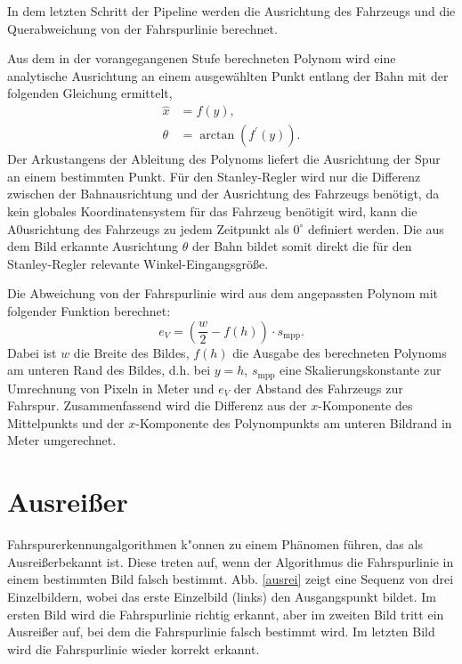 \documentclass[arbeit=studie,oneside,BCOR=12mm]{ArbeitRST}
\begin{document}
In dem letzten Schritt der Pipeline werden die Ausrichtung des Fahrzeugs und die Querabweichung von
der Fahrspurlinie berechnet. 

Aus dem in der vorangegangenen Stufe berechneten Polynom wird eine
analytische Ausrichtung an einem ausgewählten Punkt entlang der Bahn mit der
folgenden Gleichung ermittelt, 
\begin{subequations} 
    \begin{align}
        \hat{x} &= f(y), \\
        \theta &= \arctan(f^\prime(y)).
    \end{align}
\end{subequations} 
Der Arkustangens der Ableitung des Polynoms liefert die Ausrichtung der Spur
an einem bestimmten Punkt. Für den Stanley-Regler wird nur die Differenz
zwischen der Bahnausrichtung und der Ausrichtung des Fahrzeugs benötigt, da
kein globales Koordinatensystem für das Fahrzeug benötigit wird, kann die
A0usrichtung des Fahrzeugs zu jedem Zeitpunkt als $0^{\circ}$ definiert
werden. Die aus dem Bild erkannte Ausrichtung $\theta$ der Bahn bildet somit
direkt die für den Stanley-Regler relevante Winkel-Eingangsgröße.

Die Abweichung von der Fahrspurlinie wird aus dem angepassten Polynom mit
folgender Funktion berechnet: 
\begin{equation}
    e_{V} = \left(\frac{w}{2} - f(h)\right)\cdot s_\mathrm{mpp}.
\end{equation}
Dabei ist $w$ die Breite des Bildes, $f(h)$ die Ausgabe des berechneten
Polynoms am unteren Rand des Bildes, d.h. bei $y=h$, $s_\mathrm{mpp}$ eine Skalierungskonstante zur
Umrechnung von Pixeln in Meter und $e_{V}$ der Abstand des Fahrzeugs zur
Fahrspur. Zusammenfassend wird die Differenz aus der $x$-Komponente des
Mittelpunkts und der $x$-Komponente des Polynompunkts am unteren Bildrand in
Meter umgerechnet.

\section{Ausrei{\ss}er}

Fahrspurerkennungalgorithmen k"onnen zu einem Phänomen führen, das als \glqq
Ausreißer\grqq bekannt ist. Diese treten auf, wenn der Algorithmus die
Fahrspurlinie in einem bestimmten Bild falsch bestimmt. Abb. \ref{ausrei} zeigt
eine Sequenz von drei Einzelbildern, wobei das erste Einzelbild (links) den
Ausgangspunkt bildet. Im ersten Bild wird die Fahrspurlinie richtig erkannt,
aber im zweiten Bild tritt ein Ausreißer auf, bei dem die Fahrspurlinie falsch
bestimmt wird. Im letzten Bild wird die Fahrspurlinie wieder korrekt erkannt.
\end{document}
